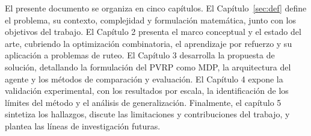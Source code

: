 El presente documento se organiza en cinco capítulos. El Capítulo~\ref{sec:def} define el problema, su contexto, complejidad y formulación matemática, junto con los objetivos del trabajo. El Capítulo 2 presenta el marco conceptual y el estado del arte, cubriendo la optimización combinatoria, el aprendizaje por refuerzo y su aplicación a problemas de ruteo. El Capítulo 3 desarrolla la propuesta de solución, detallando la formulación del PVRP como MDP, la arquitectura del agente y los métodos de comparación y evaluación. El Capítulo 4 expone la validación experimental, con los resultados por escala, la identificación de los límites del método y el análisis de generalización. Finalmente, el capítulo 5 sintetiza los hallazgos, discute las limitaciones y contribuciones del trabajo, y plantea las líneas de investigación futuras.

